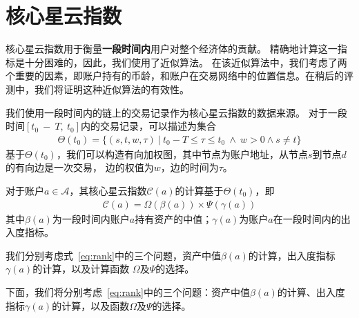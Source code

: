 \section{核心星云指数}

核心星云指数用于衡量{\textbf{一段时间内}}用户对整个经济体的贡献。
精确地计算这一指标是十分困难的，因此，我们使用了近似算法。
在该近似算法中，我们考虑了两个重要的因素，即账户持有的币龄，和账户在交易网络中的位置信息。在稍后的评测中，我们将证明这种近似算法的有效性。


我们使用一段时间内的链上的交易记录作为核心星云指数的数据来源。
对于一段时间$[t_0\ −\ T,\ t_0]$内的交易记录，可以描述为集合
\begin{align}
\Theta(t_0) = \{(s, t, w, \tau)\ |\ t_0 - T \le \tau \le t_0\ \land \ w > 0 \land s \neq t \}
\end{align}
\noindent 基于$\Theta(t_0)$，我们可以构造有向加权图，其中节点为账户地址，从节点$s$到节点$d$的有向边是一次交易，
边的权值为$w$，边的时间为$\tau$。


对于账户$a \in \mathcal{A}$，其核心星云指数$\mathcal{C}(a)$的计算基于$\Theta(t_0)$，即
\begin{align}
\mathcal{C}(a) = \Omega(\beta(a)) \times{} \Psi(\gamma(a))
\label{eq:rank}
\end{align}
\noindent 其中$\beta(a)$为一段时间内账户$a$持有资产的中值；$\gamma(a)$为账户$a$在一段时间内的出入度指标。

我们分别考虑式~\ref{eq:rank}中的三个问题，资产中值$\beta(a)$的计算，出入度指标$\gamma(a)$的计算，以及计算函数
$\Omega$及$\Psi$的选择。



下面，我们将分别考虑~\ref{eq:rank}中的三个问题：资产中值$\beta(a)$的计算、出入度指标$\gamma(a)$的计算，以及函数$\Omega$及$\Psi$的选择。

